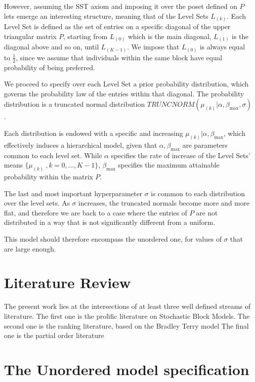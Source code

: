 \documentclass[11pt]{amsart}
\begin{document}
However, assuming the SST axiom and imposing it over the poset defined on $P$ lets emerge an interesting structure, meaning that of the Level Sets $L_{(k)}$. Each Level Set is defined as the set of entries on a specific diagonal of the upper triangular matrix $P$, starting from $L_{(0)}$ which is the main diagonal, $L_{(1)}$ is the diagonal above and so on, until $L_{(K-1)}$. We impose that $L_{(0)}$ is always equal to $\frac{1}{2}$, since we assume that individuals within the same block have equal probability of being preferred.

We proceed to specify over each Level Set a prior probability distribution, which governs the probability law of the entries within that diagonal. The probability distribution is a truncated normal distribution $TRUNCNORM(\mu_{(k)}| \alpha, \beta_{\max}, \sigma)$. 

Each distribution is endowed with a specific and increasing $\mu_{(k)}| \alpha, \beta_{\max}$, which effectively induces a hierarchical model, given that  $\alpha, \beta_{\max}$ are parameters common to each level set. While $\alpha$ specifies the rate of increase of the Level Sets' means $\{ \mu_{(k)} \ , k=0,\ldots,K-1 \}$, $\beta_{\max}$ specifies the maximum attainable probability within the matrix $P$. 

The last and most important hyperparameter $\sigma$ is common to each distribution over the level sets. As $\sigma$ increases, the truncated normals become more and more flat, and therefore we are back to a case where the entries of $P$ are not distributed in a way that is not significantly different from a uniform.

This model should therefore encompass the unordered one, for values of $\sigma$ that are large enough.
\section{Literature Review}

The present work lies at the intersections of at least three well defined streams of literature. The first one is the prolific literature on Stochastic Block Models. 
The second one is the ranking literature, based on the Bradley Terry model
The final one is the partial order literature

\section{The Unordered model specification}
\end{document}
